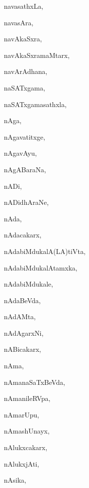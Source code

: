 \begin{multicols}{3}
{\noindent
{navasathxLa}, \pageref{navasathxLa}

\noindent
{navasAra}, \pageref{navasAra}

\noindent
{navAkaSxra}, \pageref{navAkaSxra}

\noindent
{navAkaSxramaMtarx}, \pageref{navAkaSxramaMtarx}

\noindent
{navArAdhana}, \pageref{navArAdhana}

\noindent
{naSATxgama}, \pageref{naSATxgama}

\noindent
{naSATxgamasathxla}, \pageref{naSATxgamasathxla}

\noindent
{nAga}, \pageref{nAga}

\noindent
{nAgavatitxge}, \pageref{nAgavatitxge}

\noindent
{nAgavAyu}, \pageref{nAgavAyu}

\noindent
{nAgABaraNa}, \pageref{nAgABaraNa}

\noindent
{nADi}, \pageref{nADi}

\noindent
{nADidhAraNe}, \pageref{nADidhAraNe}

\noindent
{nAda}, \pageref{nAda}

\noindent
{nAdacakarx}, \pageref{nAdacakarx}

\noindent
{nAdabiMdukalA(LA)tiVta}, \pageref{nAdabiMdukalALAtiVta}

\noindent
{nAdabiMdukalAtamxka}, \pageref{nAdabiMdukalAtamxka}

\noindent
{nAdabiMdukale}, \pageref{nAdabiMdukale}

\noindent
{nAdaBeVda}, \pageref{nAdaBeVda}

\noindent
{nAdAMta}, \pageref{nAdAMta}

\noindent
{nAdAgarxNi}, \pageref{nAdAgarxNi}

\noindent
{nABicakarx}, \pageref{nABicakarx}

\noindent
{nAma}, \pageref{nAma}

\noindent
{nAmanaSaTxBeVda}, \pageref{nAmanaSaTxBeVda}

\noindent
{nAmanileRVpa}, \pageref{nAmanileRVpa}

\noindent
{nAmarUpu}, \pageref{nAmarUpu}

\noindent
{nAmashUnayx}, \pageref{nAmashUnayx}

\noindent
{nAlukxcakarx}, \pageref{nAlukxcakarx}

\noindent
{nAlukxjAti}, \pageref{nAlukxjAti}

\noindent
{nAsika}, \pageref{nAsika}

}
\end{multicols}
